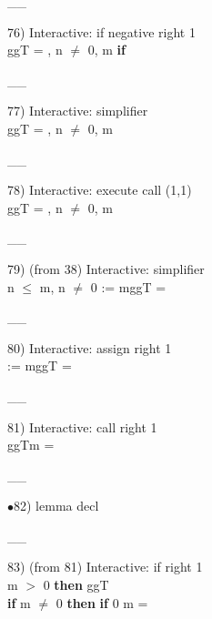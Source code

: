 \documentclass[a4paper]{article}
\begin{document}
\vspace{-1.5ex}\_\hrulefill \_

76) Interactive: if negative right  1\\
\tabf \Do ggT\Dc {} = , n $\neq$ 0, m %
\Fol \Do 
{\bf if}  %

\vspace{-1.5ex}\_\hrulefill \_

77) Interactive: simplifier \\
\Do ggT\Dc {} = , n $\neq$ 0, m %

\vspace{-1.5ex}\_\hrulefill \_

78) Interactive: execute call  (1,1)\\
\Do ggT\Dc {} = , n $\neq$ 0, m %

\vspace{-1.5ex}\_\hrulefill \_

79)  (from 38) Interactive: simplifier \\
n $\le$ m, \Not n $\neq$ 0 \Fol \Do {} := m\Dc \Do ggT\Dc {} = 

\vspace{-1.5ex}\_\hrulefill \_

80) Interactive: assign right  1\\
 \Fol \Do {} := m\Dc \Do ggT\Dc {} = 

\vspace{-1.5ex}\_\hrulefill \_

81) Interactive: call right  1\\
 \Fol \Do ggT\Dc m = 

\vspace{-1.5ex}\_\hrulefill \_

$\bullet$82) lemma decl \\
 \Fol 

\vspace{-1.5ex}\_\hrulefill \_

83)  (from 81) Interactive: if right  1\\
\Fol {} m $>$ 0 {\bf then} ggT \\
 \tabf {} {\bf if} m $\neq$ 0 {\bf then} {\bf if} 0 %
m = 
\end{document}
